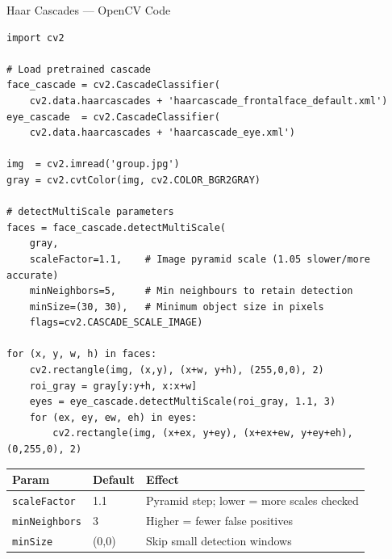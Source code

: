 \documentclass[aspectratio=169]{beamer}
\begin{document}
\begin{frame}[fragile]{Haar Cascades — OpenCV Code}
\begin{lstlisting}
import cv2

# Load pretrained cascade
face_cascade = cv2.CascadeClassifier(
    cv2.data.haarcascades + 'haarcascade_frontalface_default.xml')
eye_cascade  = cv2.CascadeClassifier(
    cv2.data.haarcascades + 'haarcascade_eye.xml')

img  = cv2.imread('group.jpg')
gray = cv2.cvtColor(img, cv2.COLOR_BGR2GRAY)

# detectMultiScale parameters
faces = face_cascade.detectMultiScale(
    gray,
    scaleFactor=1.1,    # Image pyramid scale (1.05 slower/more accurate)
    minNeighbors=5,     # Min neighbours to retain detection
    minSize=(30, 30),   # Minimum object size in pixels
    flags=cv2.CASCADE_SCALE_IMAGE)

for (x, y, w, h) in faces:
    cv2.rectangle(img, (x,y), (x+w, y+h), (255,0,0), 2)
    roi_gray = gray[y:y+h, x:x+w]
    eyes = eye_cascade.detectMultiScale(roi_gray, 1.1, 3)
    for (ex, ey, ew, eh) in eyes:
        cv2.rectangle(img, (x+ex, y+ey), (x+ex+ew, y+ey+eh), (0,255,0), 2)
\end{lstlisting}
\small
\begin{tabular}{lll}
  \toprule
  \textbf{Param} & \textbf{Default} & \textbf{Effect}\\
  \midrule
  \texttt{scaleFactor}  & 1.1   & Pyramid step; lower = more scales checked\\
  \texttt{minNeighbors} & 3     & Higher = fewer false positives\\
  \texttt{minSize}      & (0,0) & Skip small detection windows\\
  \bottomrule
\end{tabular}
\end{frame}
\end{document}
